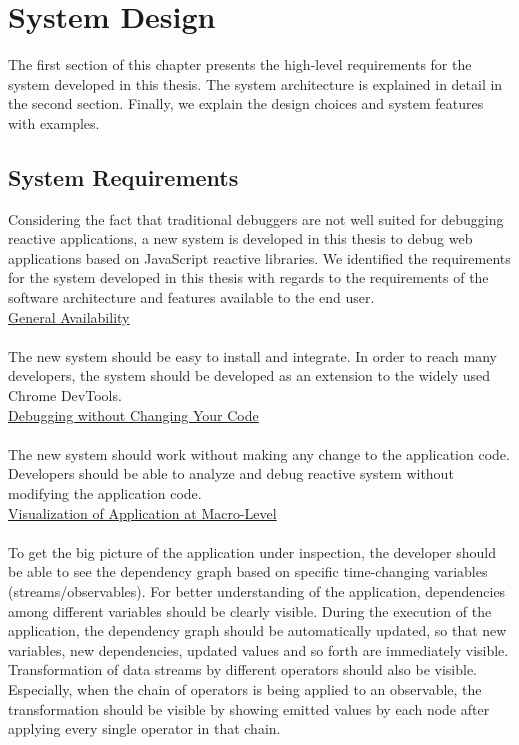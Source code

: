 \chapter{System Design} \label{chap:System Design}
The first section of this chapter presents the high-level requirements for the system developed in this thesis. The system architecture is explained in detail in the second section. Finally, we explain the design choices and system features with examples.

\section{System Requirements}
Considering the fact that traditional debuggers are not well suited for debugging reactive applications, a new system is developed in this thesis to debug web applications based on JavaScript reactive libraries. We identified the requirements for the system developed in this thesis with regards to the requirements of the software architecture and features available to the end user.\\


\underline{General Availability}\\
\\
The new system should be easy to install and integrate. In order to reach many developers, the system should be developed as an extension to the widely used Chrome DevTools.\\


\underline{Debugging without Changing Your Code}\\
\\
The new system should work without making any change to the application code. Developers should be able to analyze and debug reactive system without modifying the application code.\\


\underline{Visualization of Application at Macro-Level}\\
\\
To get the big picture of the application under inspection, the developer should be able to see the dependency graph based on specific time-changing variables (streams/observables). For better understanding of the application, dependencies among different variables should be clearly visible. During the execution of the application, the dependency graph should be automatically updated, so that new variables,
new dependencies, updated values and so forth are immediately visible. Transformation of data streams by different operators should also be visible. Especially, when the chain of operators is being applied to an observable, the transformation should be visible by showing emitted values by each node after applying every single operator in that chain.\\



